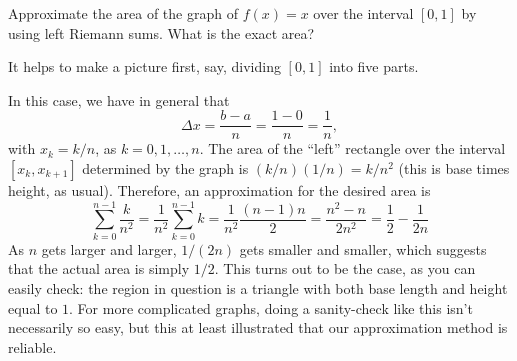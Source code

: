 \documentclass[nooutcomes]{ximera}
\begin{document}
\begin{example}
  Approximate the area of the graph of $f(x) = x$ over the interval $[0,1]$ by using left Riemann sums. What is the exact area?


  \begin{explanation}
    It helps to make a picture first, say, dividing $[0,1]$ into five parts.

    \begin{image}
\end{image}


    In this case, we have in general that $$\Delta x = \frac{b-a}{n} = \frac{1-0}{n} = \frac{1}{n},$$with $x_k = k/n$, as $k=0,1,\ldots, n$. The area of the ``left'' rectangle over the interval $[x_k,x_{k+1}]$ determined by the graph is $(k/n)(1/n) = k/n^2$ (this is base times height, as usual). Therefore, an approximation for the desired area is $$\sum_{k=0}^{n-1}\frac{k}{n^2} = \frac{1}{n^2}\sum_{k=0}^{n-1} k = \frac{1}{n^2} \frac{(n-1)n}{2} = \frac{n^2-n}{2n^2} = \frac{1}{2} - \frac{1}{2n}$$
As $n$ gets larger and larger, $1/(2n)$ gets smaller and smaller, which suggests that the actual area is simply $1/2$. This turns out to be the case, as you can easily check: the region in question is a triangle with both base length and height equal to $1$. For more complicated graphs, doing a sanity-check like this isn't necessarily so easy, but this at least illustrated that our approximation method is reliable.    
  \end{explanation}
\end{example}
\end{document}
